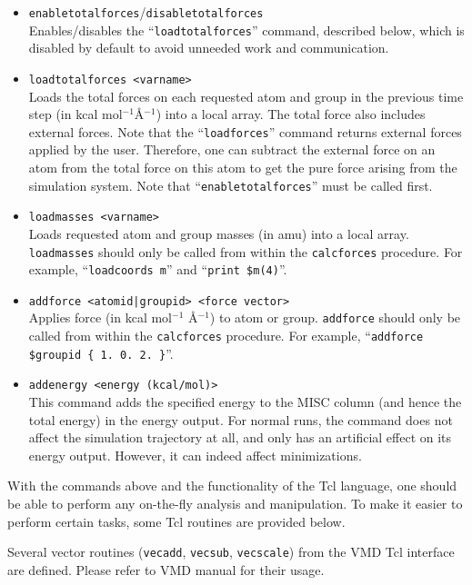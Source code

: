 \begin{itemize}
\item
{\tt enabletotalforces}/{\tt disabletotalforces} \\
Enables/disables the ``{\tt loadtotalforces}'' command, described below,
which is disabled by default to avoid unneeded work and communication.

\item
{\tt loadtotalforces <varname>} \\
Loads the total forces on each requested atom and group in the previous
time step (in kcal mol$^{-1}$\AA$^{-1}$) into a local array. The
total force also includes external forces. Note that the
``{\tt loadforces}'' command returns external forces applied by
the user. Therefore, one can subtract the external force on an
atom from the total force on this atom to get the pure force
arising from the simulation system.
Note that ``{\tt enabletotalforces}'' must be called first.

\item
{\tt loadmasses <varname>} \\
Loads requested atom and group masses (in amu) into a local array.
{\tt loadmasses} should only be called from within the {\tt calcforces} procedure.
For example, ``{\tt loadcoords m}'' and ``{\tt print \$m(4)}''.

\item
{\tt addforce <atomid|groupid> <force vector>} \\
Applies force (in kcal mol$^{-1}$ \AA$^{-1}$) to atom or group.
{\tt addforce} should only be called from within the {\tt calcforces} procedure.
For example, ``\verb!addforce $groupid { 1. 0. 2. }!''.

\item
{\tt addenergy <energy (kcal/mol)>} \\
This command adds the specified energy to the MISC column (and
hence the total energy) in the energy output. For normal runs,
the command does not affect the simulation trajectory at all, and
only has an artificial effect on its energy output. However, it
can indeed affect minimizations.

\end{itemize}

With the commands above and the functionality of the Tcl language,
one should be able to perform any on-the-fly analysis and
manipulation. To make it easier to perform certain tasks,
some Tcl routines are provided below.

Several vector routines ({\tt vecadd}, {\tt vecsub}, {\tt vecscale})
from the VMD Tcl interface are defined. Please refer to VMD
manual for their usage.

